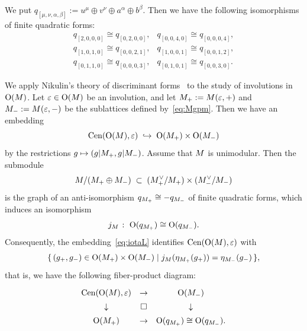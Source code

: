 \documentclass{amsart} %
\begin{document}
\begin{remark}\label{rem:isomqs}
We put $q_{[\mu,\nu, \alpha, \beta]}:=u^{\mu}\oplus v^{\nu} \oplus a^{\alpha}\oplus b^{\beta}$. 
Then we have the following isomorphisms of finite quadratic forms:
%
%
\[
\renewcommand{\arraystretch}{1.1}
\begin{array}{ll}
q_{[ 2, 0, 0, 0]}\cong q_{[ 0, 2, 0, 0]}, &
q_{[ 0, 0, 4, 0]}\cong q_{[ 0, 0, 0, 4]}, \\
q_{[ 1, 0, 1, 0]}\cong q_{[ 0, 0, 2, 1 ]}, &
q_{[ 1, 0, 0, 1]}\cong q_{[ 0, 0, 1, 2 ]},\\
q_{[ 0, 1, 1, 0 ]}\cong q_{[ 0, 0, 0, 3 ]}, &
q_{[ 0, 1, 0, 1 ]}\cong q_{[ 0, 0, 3, 0]}.
\end{array}
\]
\end{remark}
%
%
We apply 
Nikulin's theory of discriminant forms~\cite{MR525944}
to the study of involutions in $\mathord{\mathrm{O}}(M)$.
Let $\varepsilon \in \mathord{\mathrm{O}}(M)$ be an involution, 
and let
$M_+:=M(\varepsilon,+)$ and
$M_-:=M(\varepsilon,-)$
be the sublattices defined by~\eqref{eq:Mgpm}.
Then we have an embedding
%
\begin{equation}\label{eq:iotaL}
\mathrm{Cen}(\mathord{\mathrm{O}}(M), \varepsilon)\;\hookrightarrow\; \mathord{\mathrm{O}}(M_+)\times \mathord{\mathrm{O}}(M_-)
\end{equation}
%
by the restrictions $g\mapsto (g|M_+, g|M_-)$.
Assume that $M$ is unimodular.
Then the submodule
\[
M/(M_+\oplus M_-) \;\subset\; (M_+^{\vee}/M_+)\times (M_-^{\vee}/M_-)
\]
is the graph of an anti-isomorphism
$q_{M_+} \cong -q_{M_-}$
of finite quadratic forms,
which 
induces an isomorphism
\[
j_M\;\colon\; \mathord{\mathrm{O}}(q_{M_+}) \cong \mathord{\mathrm{O}}(q_{M_-}).
\]
Consequently, the embedding~\eqref{eq:iotaL} identifies
$\mathrm{Cen}(\mathord{\mathrm{O}}(M),\varepsilon)$ with
%
\begin{equation*}\label{eq:CenL}
\{\,{(g_{+}, g_{-})\in \mathord{\mathrm{O}}(M_+)\times \mathord{\mathrm{O}}(M_-)}\mid {j_M(\eta_{M_+}(g_{+}))=\eta_{M_-}(g_{-})} \,\},
\end{equation*}
%
that is, we have the following fiber-product diagram:
%
\begin{equation}\label{eq:groupfibprodCenvep}
\renewcommand{\arraystretch}{1.4}
\begin{array}{ccc}
\Cen(\OG(\dLat), \vep) &\to & \OG(\dLatminus) \\
\downarrow & \square& \downarrow \\
\OG(\dLatplus) & \to & \OG(q_{\dLatplus}) \cong \OG(q_{\dLatminus}).
\end{array}
\end{equation}
%
%
\end{document}
